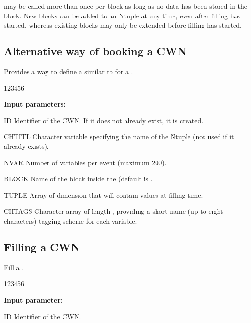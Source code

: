  may be called more than once per block as long as no data
has been stored in the block. 
New blocks can be added to an Ntuple at any time, even after filling has started,
whereas existing blocks may only be extended before filling has started.


\subsection*{Alternative way of booking a CWN}


\Action Provides a way to define a \CWN{} similar to 
 for a \RWN{}.

\begin{DLtt}{123456}
\item[{\rm\bf Input parameters:}]
\item[ID] Identifier of the CWN{}.
          If it does not already exist, it is created.
\item[CHTITL] Character variable specifying the name of the Ntuple
          (not used if it already exists).
\item[NVAR]  Number of variables per event (maximum 200).
\item[BLOCK] Name of the block inside the \CWN (default is .
\item[TUPLE] Array of dimension  that will contain values at filling
                 time.
\item[CHTAGS] Character array of length , providing a short
    name (up to eight characters) tagging scheme for each variable.
\end{DLtt}

\subsection{Filling a CWN}
\label{HNTUFILLT} 

 
\Action Fill a \CWN{}.
 
\begin{DLtt}{123456}
\item[{\rm\bf Input parameter:}]
\item[ID] Identifier of the CWN{}.
\end{DLtt}
\Rind[HROPEN]{}
\Rind[HBNT]{}
\Rind[HBNAME]{}
\Rind[HBNAMC]{}
\Rind[HFNT]{}
\Rind[HROUT]{}
\Rind[HREND]{}



